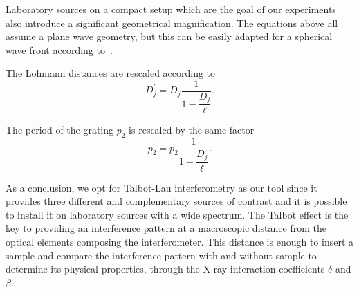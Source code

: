 Laboratory sources on a compact setup which are the goal of our experiments
also introduce a significant geometrical magnification. The equations above
all assume a plane wave geometry, but this can be easily adapted for a
spherical wave front according to~\parencite{Engelhardt2008}.

The Lohmann distances are rescaled according to
\begin{equation}
    D_j^\prime = D_j \frac{1}{1 -
        \dfrac{D_j}{\ell}}.\label{eq:magnification-distance}
\end{equation}

The period of the grating $p_2$ is rescaled by the same factor
\begin{equation}
    p_2^\prime = p_2 \frac{1}{1 -
        \dfrac{D_j}{\ell}}.\label{eq:magnification}
\end{equation}

As a conclusion, we opt for Talbot-Lau interferometry as our tool since it
provides three different and complementary sources of contrast and it is
possible to install it on laboratory sources with a wide spectrum. The
Talbot effect is the key to providing an interference pattern at a
macroscopic distance from the optical elements composing the interferometer.
This distance is enough to insert a sample and compare the interference
pattern with and without sample to determine its physical properties,
through the X-ray interaction coefficients $\delta$ and $\beta$.
